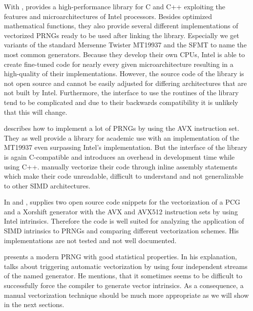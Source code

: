 \documentclass{stdlocal}
\begin{document}
  With , \citeauthor{intel-mkl} provides a high-performance library for C and C++ exploiting the features and microarchitectures of Intel processors.
  Besides optimized mathematical functions, they also provide several different implementations of vectorized PRNGs ready to be used after linking the library.
  Especially we get variants of the standard Mersenne Twister MT19937 and the SFMT to name the most common generators.
  Because they develop their own CPUs, Intel is able to create fine-tuned code for nearly every given microarchitecture resulting in a high-quality of their implementations.
  However, the source code of the library is not open source and cannot be easily adjusted for differing architectures that are not built by Intel.
  Furthermore, the interface to use the routines of the library tend to be complicated and due to their backwards compatibility it is unlikely that this will change.

  \textcite{barash2017} describes how to implement a lot of PRNGs by using the AVX instruction set.
  They as well provide a library for academic use with an implementation of the MT19937 even surpassing Intel's implementation.
  But the interface of the library is again C-compatible and introduces an overhead in development time while using C++.
  \citeauthor{barash2017} manually vectorize their code through inline assembly statements which make their code unreadable, difficult to understand and not generalizable to other SIMD architectures.

  In \textcite{lemire-pcg} and \textcite{lemire-xorshift}, \citeauthor{lemire-pcg} supplies two open source code snippets for the vectorization of a PCG and a Xorshift generator with the AVX and AVX512 instruction sets by using Intel intrinsics.
  Therefore the code is well suited for analyzing the application of SIMD intrinsics to PRNGs and comparing different vectorization schemes.
  His implementations are not tested and not well documented.

  \textcite{vigna-xoroshiro} presents a modern PRNG with good statistical properties.
  In his explanation, \citeauthor{vigna-xoroshiro} talks about triggering automatic vectorization by using four independent streams of the named generator.
  He mentions, that it sometimes seems to be difficult to successfully force the compiler to generate vector intrinsics.
  As a consequence, a manual vectorization technique should be much more appropriate as we will show in the next sections.
\end{document}
